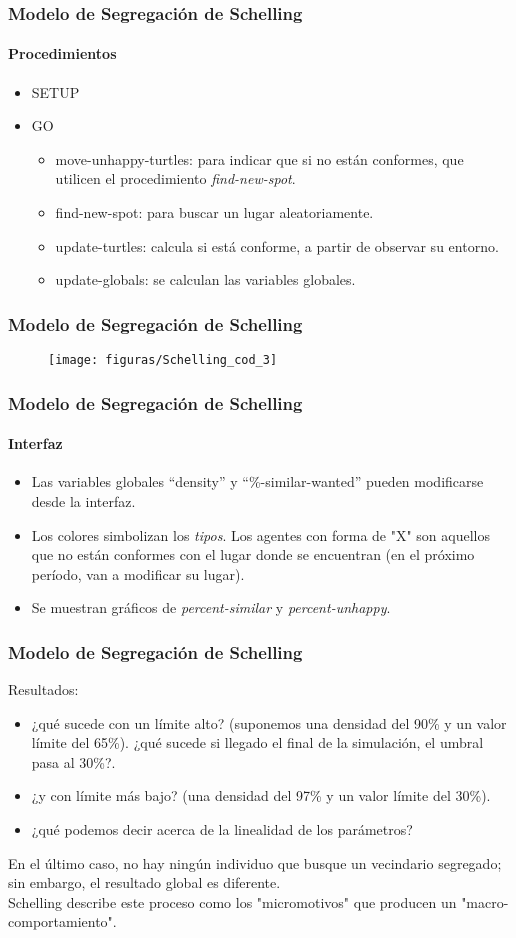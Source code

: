 \documentclass[11pt]{beamer}
\begin{document}
\begin{frame}
\frametitle{Modelo de Segregación de Schelling}
\framesubtitle{Procedimientos}
\begin{itemize}
	\item SETUP
	\item GO
	\begin{itemize}
	\item move-unhappy-turtles: para indicar que si no están conformes, que utilicen el procedimiento \textit{find-new-spot}.
	\item find-new-spot: para buscar un lugar aleatoriamente.
	\item update-turtles: calcula si está conforme, a partir de observar su entorno.
	\item update-globals: se calculan las variables globales.
	\end{itemize}
\end{itemize}
\end{frame}

\begin{frame}
	\frametitle{Modelo de Segregación de Schelling}
	\begin{figure}
		\centering
		\texttt{[image: figuras/Schelling\_cod\_3]}
		\label{fig:schellingcod3}
	\end{figure}
\end{frame}

\begin{frame}
\frametitle{Modelo de Segregación de Schelling}
\framesubtitle{Interfaz}
\begin{itemize}
	\item Las variables globales ``density'' y ``\%-similar-wanted'' pueden modificarse desde la interfaz.
	\item Los colores simbolizan los \textit{tipos}. Los agentes con forma de "X" son aquellos que no están conformes con el lugar donde se encuentran (en el próximo período, van a modificar su lugar).
	\item Se muestran gráficos de \textit{percent-similar} y \textit{percent-unhappy}.
\end{itemize}	
\end{frame}


\begin{frame}
\frametitle{Modelo de Segregación de Schelling}
Resultados:
\begin{itemize}
	\item ¿qué sucede con un límite alto? (suponemos una densidad del 90\% y un valor límite del 65\%). ¿qué sucede si llegado el final de la simulación, el umbral pasa al 30\%?.
	\item ¿y con límite más bajo? (una densidad del 97\% y un valor límite del 30\%).
	\item ¿qué podemos decir acerca de la linealidad de los parámetros?
\end{itemize}
En el último caso, no hay ningún individuo que busque un vecindario segregado; sin embargo, el resultado global es diferente.
\\ Schelling describe este proceso como los "micromotivos" que producen un "macro-comportamiento".
\end{frame}
\end{document}
